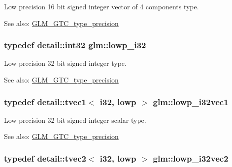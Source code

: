 Low precision 16 bit signed integer vector of 4 components type. \begin{Desc}
\item[See also:]\hyperlink{group__gtc__type__precision}{GLM\_\-GTC\_\-type\_\-precision} \end{Desc}
\hypertarget{group__gtc__type__precision_g70fd34e8b8cffc92739161284ed77328}{
\subsubsection[lowp\_\-i32]{\setlength{\rightskip}{0pt plus 5cm}typedef detail::int32 {\bf glm::lowp\_\-i32}}}
\label{group__gtc__type__precision_g70fd34e8b8cffc92739161284ed77328}


Low precision 32 bit signed integer type. \begin{Desc}
\item[See also:]\hyperlink{group__gtc__type__precision}{GLM\_\-GTC\_\-type\_\-precision} \end{Desc}
\hypertarget{group__gtc__type__precision_gdb82f1c8a0f4d3304862d32079961974}{
\subsubsection[lowp\_\-i32vec1]{\setlength{\rightskip}{0pt plus 5cm}typedef detail::tvec1$<$ i32, lowp $>$ {\bf glm::lowp\_\-i32vec1}}}
\label{group__gtc__type__precision_gdb82f1c8a0f4d3304862d32079961974}


Low precision 32 bit signed integer scalar type. \begin{Desc}
\item[See also:]\hyperlink{group__gtc__type__precision}{GLM\_\-GTC\_\-type\_\-precision} \end{Desc}
\hypertarget{group__gtc__type__precision_g1ac855a9b4ef24908d00ab715e7ddbff}{
\subsubsection[lowp\_\-i32vec2]{\setlength{\rightskip}{0pt plus 5cm}typedef detail::tvec2$<$ i32, lowp $>$ {\bf glm::lowp\_\-i32vec2}}}
\label{group__gtc__type__precision_g1ac855a9b4ef24908d00ab715e7ddbff}


